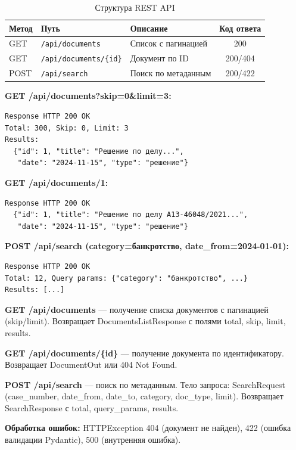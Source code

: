 \documentclass[a4paper,12pt]{article}
\begin{document}
\begin{table}[H]
\centering
\caption{Структура REST API}
\begin{tabular}{|l|l|l|c|}
\hline
\textbf{Метод} & \textbf{Путь} & \textbf{Описание} & \textbf{Код ответа} \\ \hline
GET  & \texttt{/api/documents}      & Список с пагинацией & 200 \\ \hline
GET  & \texttt{/api/documents/\{id\}} & Документ по ID      & 200/404 \\ \hline
POST & \texttt{/api/search}         & Поиск по метаданным & 200/422 \\ \hline
\end{tabular}
\end{table}

\begin{infobox}
\textbf{GET /api/documents?skip=0\&limit=3:}
\begin{verbatim}
Response HTTP 200 OK
Total: 300, Skip: 0, Limit: 3
Results:
  {"id": 1, "title": "Решение по делу...", 
   "date": "2024-11-15", "type": "решение"}
\end{verbatim}

\textbf{GET /api/documents/1:}
\begin{verbatim}
Response HTTP 200 OK
  {"id": 1, "title": "Решение по делу A13-46048/2021...",
   "date": "2024-11-15", "type": "решение"}
\end{verbatim}

\textbf{POST /api/search (category=банкротство, date\_from=2024-01-01):}
\begin{verbatim}
Response HTTP 200 OK
Total: 12, Query params: {"category": "банкротство", ...}
Results: [...]
\end{verbatim}
\end{infobox}

\begin{infobox}
\textbf{GET /api/documents} — получение списка документов с пагинацией (skip/limit). Возвращает DocumentsListResponse с полями total, skip, limit, results.

\textbf{GET /api/documents/\{id\}} — получение документа по идентификатору. Возвращает DocumentOut или 404 Not Found.

\textbf{POST /api/search} — поиск по метаданным. Тело запроса: SearchRequest (case\_number, date\_from, date\_to, category, doc\_type, limit). Возвращает SearchResponse с total, query\_params, results.

\textbf{Обработка ошибок:} HTTPException 404 (документ не найден), 422 (ошибка валидации Pydantic), 500 (внутренняя ошибка).
\end{infobox}
\end{document}
